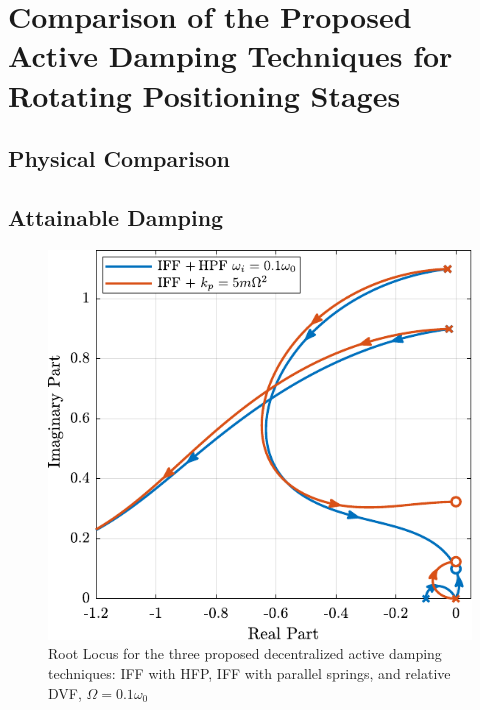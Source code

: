 \documentclass{ISMA_USD2020}
\begin{document}
\section{Comparison of the Proposed Active Damping Techniques for Rotating Positioning Stages}
\label{sec:orgf0c901c}
\label{sec:comparison}
\subsection{Physical Comparison}
\label{sec:orgb81fedd}



\subsection{Attainable Damping}
\label{sec:org9975e71}

\begin{figure}[htbp]
\centering
\includegraphics[scale=1]{figs/comp_root_locus.pdf}
\caption{\label{fig:comp_root_locus}Root Locus for the three proposed decentralized active damping techniques: IFF with HFP, IFF with parallel springs, and relative DVF, \(\Omega = 0.1 \omega_0\)}
\end{figure}
\end{document}
